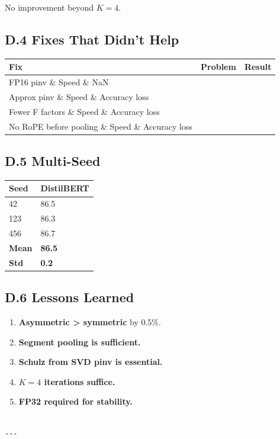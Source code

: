 No improvement beyond $K = 4$.

\subsection{D.4 Fixes That Didn't Help}

\begin{table}[H]
\centering
\small
\begin{tabular}{lll}
\toprule
\textbf{Fix} & \textbf{Problem} & \textbf{Result} \\
\midrule
FP16 pinv \& Speed \& NaN \\
Approx pinv \& Speed \& Accuracy loss \\
Fewer F factors \& Speed \& Accuracy loss \\
No RoPE before pooling \& Speed \& Accuracy loss \\
\bottomrule
\end{tabular}
\end{table}

\subsection{D.5 Multi-Seed}

\begin{table}[H]
\centering
\small
\begin{tabular}{ll}
\toprule
\textbf{Seed} & \textbf{DistilBERT} \\
\midrule
42 & 86.5 \\
123 & 86.3 \\
456 & 86.7 \\
\textbf{Mean} & \textbf{86.5} \\
\textbf{Std} & \textbf{0.2} \\
\bottomrule
\end{tabular}
\end{table}

\subsection{D.6 Lessons Learned}

\begin{enumerate}
\item \textbf{Asymmetric \textgreater{} symmetric} by 0.5\%.
\item \textbf{Segment pooling is sufficient.}
\item \textbf{Schulz from SVD pinv is essential.}
\item \textbf{$K = 4$ iterations suffice.}
\item \textbf{FP32 required for stability.}
\end{enumerate}
\begin{lstlisting}

---
\end{lstlisting}